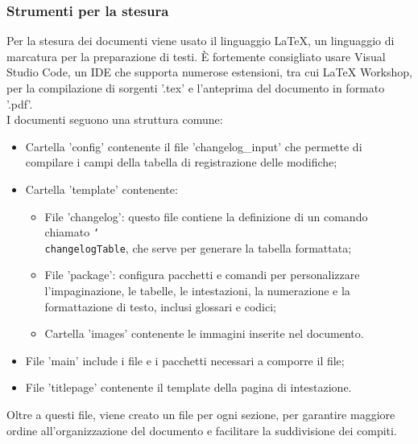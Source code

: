 \subsubsection{Strumenti per la stesura}
Per la stesura dei documenti viene usato il linguaggio LaTeX, un linguaggio di
marcatura per la preparazione di testi. È fortemente consigliato usare
Visual Studio Code, un IDE che supporta numerose estensioni, tra cui LaTeX
Workshop, per la compilazione di sorgenti '.tex' e l'anteprima del documento in
formato '.pdf'. \\I documenti seguono una struttura comune:
\begin{itemize}
      \item Cartella 'config' contenente il file 'changelog\_input' che permette di
            compilare i campi della tabella di registrazione delle modifiche;
      \item Cartella 'template' contenente:
            \begin{itemize}
                  \item File 'changelog': questo file contiene la definizione di un comando chiamato
                        \texttt{\char`\\changelogTable}, che serve per generare la tabella formattata;
                  \item File 'package': configura pacchetti e comandi per personalizzare
                        l'impaginazione, le tabelle, le intestazioni, la numerazione e la formattazione
                        di testo, inclusi glossari e codici;
                  \item Cartella 'images' contenente le immagini inserite nel documento.
            \end{itemize}
      \item File 'main' include i file e i pacchetti necessari a comporre il file;
      \item File 'titlepage' contenente il template della pagina di intestazione.
\end{itemize}
Oltre a questi file, viene creato un file per ogni sezione, per garantire maggiore ordine all'organizzazione
del documento e facilitare la suddivisione dei compiti.
